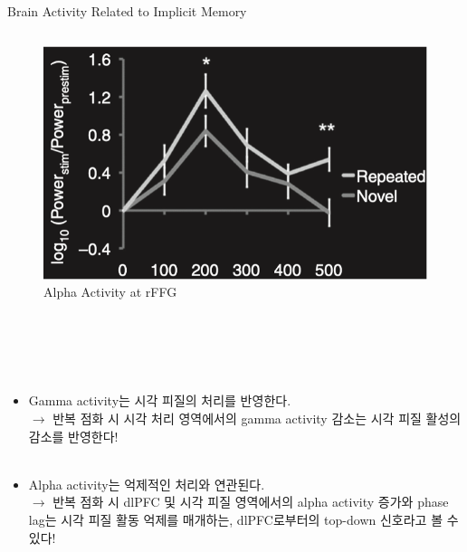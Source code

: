 \documentclass{beamer}
\begin{document}
\begin{frame}{Brain Activity Related to Implicit Memory}
\begin{columns}
    \hfill
    \begin{column}{0.38\textwidth}
      \centering
      \begin{figure}
        \centering
        \includegraphics[width=\textwidth]{image/alpha_im}
        \caption{Alpha Activity at rFFG}
      \end{figure}
    \end{column}
  \end{columns}
\end{frame}

\begin{frame}
  \begin{block}{}
    \large\\~\\~\\
    \begin{itemize}
      \item Gamma activity는 시각 피질의 처리를 반영한다.\\
        $\rightarrow$ {\color{red} 반복 점화 시 시각 처리 영역에서의 gamma activity 감소는 시각 피질 활성의 감소를 반영한다!}\\~\\

      \item Alpha activity는 억제적인 처리와 연관된다.\\
        $\rightarrow$ 반복 점화 시 dlPFC 및 시각 피질 영역에서의 {\color{red} alpha activity 증가와 phase lag는 시각 피질 활동 억제를 매개하는, dlPFC로부터의 top-down 신호라고 볼 수 있다!}
    \end{itemize}\\~\\~\\
  \end{block}
\end{frame}
\end{document}
